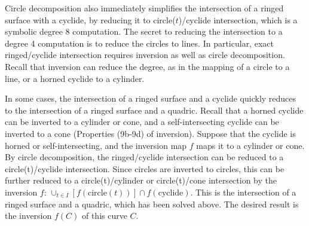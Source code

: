 
Circle decomposition also immediately simplifies the intersection
of a ringed surface with a cyclide,
by reducing it to circle($t$)/cyclide intersection, 
which is a symbolic degree 8 computation.
The secret to reducing the intersection to a degree 4 computation 
is to reduce the circles to lines.
In particular, exact ringed/cyclide intersection
requires inversion as well as circle decomposition.
%
%
Recall that inversion can reduce the degree, as in the mapping
of a circle to a line, or a horned cyclide to a cylinder.

In some cases, the intersection of a ringed surface and a cyclide quickly 
reduces to the intersection of a ringed surface and a quadric.
Recall that a horned cyclide can be inverted to a cylinder or cone,
and a self-intersecting cyclide can be inverted to a cone
(Properties (9b-9d) of inversion).
Suppose that the cyclide is horned or self-intersecting,
and the inversion map $f$ maps it to a cylinder or cone.
By circle decomposition, the ringed/cyclide intersection can be reduced to
a circle(t)/cyclide intersection.
Since circles are inverted to circles, this can 
be further reduced to a circle(t)/cylinder or circle(t)/cone intersection
by the inversion $f$:
$\cup_{t \in I} [f(\mbox{circle}(t))] \cap f(\mbox{cyclide})$.
This is the intersection of a ringed surface and a quadric,
which has been solved above.
The desired result is the inversion $f(C)$ of this curve $C$.

